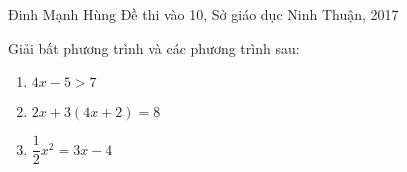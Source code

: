   
\begin{name}
{Đinh Mạnh Hùng}
{Đề thi vào 10, Sở giáo dục Ninh Thuận, 2017}
\end{name}
\setcounter{ex}{0}
\begin{ex}%
	Giải bất phương trình và các phương trình sau:
	\begin{enumerate}
		\item $4x-5>7$ 
		\item $2x+3(4x+2)=8$ 
		\item $\dfrac{1}{2}x^{2}=3x-4$ 
	\end{enumerate}
\end{ex} 

